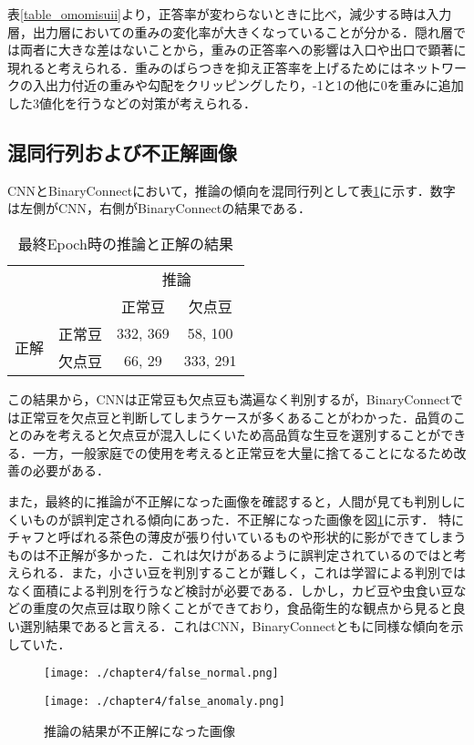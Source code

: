 表\ref{table_omomisuii}より，正答率が変わらないときに比べ，減少する時は入力層，出力層においての重みの変化率が大きくなっていることが分かる．隠れ層では両者に大きな差はないことから，重みの正答率への影響は入口や出口で顕著に現れると考えられる．重みのばらつきを抑え正答率を上げるためにはネットワークの入出力付近の重みや勾配をクリッピングしたり，-1と1の他に0を重みに追加した3値化\cite{li2022ternary}を行うなどの対策が考えられる．

\subsection{混同行列および不正解画像}
CNNとBinaryConnectにおいて，推論の傾向を混同行列として表\ref{table_conf}に示す．数字は左側がCNN，右側がBinaryConnectの結果である．
\begin{table}[htbp]
  \caption{最終Epoch時の推論と正解の結果}
  \label{table_conf}
  \centering
  \begin{tabular}{cc|cc}
    \multicolumn{2}{c|}{} & \multicolumn{2}{c}{推論}\\
    &  & 正常豆& 欠点豆\\
    \hline
    \multirow{2}{*}{正解}& 正常豆& 332, 369& 58, 100\\
    & 欠点豆& 66, 29& 333, 291
  \end{tabular}
\end{table}

この結果から，CNNは正常豆も欠点豆も満遍なく判別するが，BinaryConnectでは正常豆を欠点豆と判断してしまうケースが多くあることがわかった．品質のことのみを考えると欠点豆が混入しにくいため高品質な生豆を選別することができる．一方，一般家庭での使用を考えると正常豆を大量に捨てることになるため改善の必要がある．

また，最終的に推論が不正解になった画像を確認すると，人間が見ても判別しにくいものが誤判定される傾向にあった．不正解になった画像を図\ref{fig_false_image}に示す．
特にチャフと呼ばれる茶色の薄皮が張り付いているものや形状的に影ができてしまうものは不正解が多かった．これは欠けがあるように誤判定されているのではと考えられる．また，小さい豆を判別することが難しく，これは学習による判別ではなく面積による判別を行うなど検討が必要である．しかし，カビ豆や虫食い豆などの重度の欠点豆は取り除くことができており，食品衛生的な観点から見ると良い選別結果であると言える．これはCNN，BinaryConnectともに同様な傾向を示していた．
\begin{figure}[htbp]
  \begin{minipage}[b]{0.5\linewidth}
    \centering
    \texttt{[image: ./chapter4/false\_normal.png]}
  \end{minipage}
  \begin{minipage}[b]{0.5\linewidth}
    \centering
    \texttt{[image: ./chapter4/false\_anomaly.png]}
  \end{minipage}
  \caption{推論の結果が不正解になった画像}
  \label{fig_false_image}
\end{figure}

